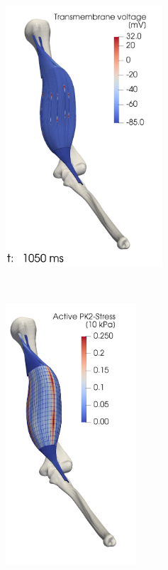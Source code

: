 \begin{figure}
  \centering%
  \begin{subfigure}[t]{0.34\textwidth}%
    \centering%
    \includegraphics[height=97mm]{images/results/application/precice_activated_muscles1.png}%
    \caption{}%
    \label{fig:precice_activated_muscles_1}%
  \end{subfigure}\,
  \begin{subfigure}[t]{0.28\textwidth}%
    \centering%
    \includegraphics[height=97mm]{images/results/application/precice_activated_muscles2.png}%
    \caption{}%
    \label{fig:precice_activated_muscles_2}%
  \end{subfigure}
  \begin{subfigure}[t]{0.28\textwidth}%
    \centering%

\end{subfigure}
\end{figure}
